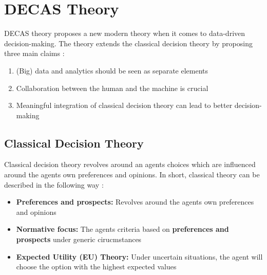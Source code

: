 \section{DECAS Theory \label{sec:DECAS}}

DECAS theory proposes a new modern theory when it comes to data-driven 
decision-making. The theory extends the classical decision theory by 
proposing three main claims \cite{DECAS}: 

\begin{enumerate}
    \item (Big) data and analytics should be seen as separate elements
    \item Collaboration between the human and the machine is crucial
    \item Meaningful integration of classical decision theory can lead to better decision-making
\end{enumerate}

\subsection{Classical Decision Theory}\label{subsec:ClassicalDecisionTheory}

Classical decision theory revolves around an agents choices which are influenced around the agents own preferences
and opinions. In short, classical theory can be described in the following way \cite{sep-decision-theory}:

\begin{itemize}
    \item \textbf{Preferences and prospects:} Revolves around the agents own preferences and opinions
    \item \textbf{Normative focus:} The agents criteria based on \textbf{preferences and prospects} under generic cirucmstances
    \item \textbf{Expected Utility (EU) Theory:} Under uncertain situations, the agent will choose the option with the highest expected values
\end{itemize}

